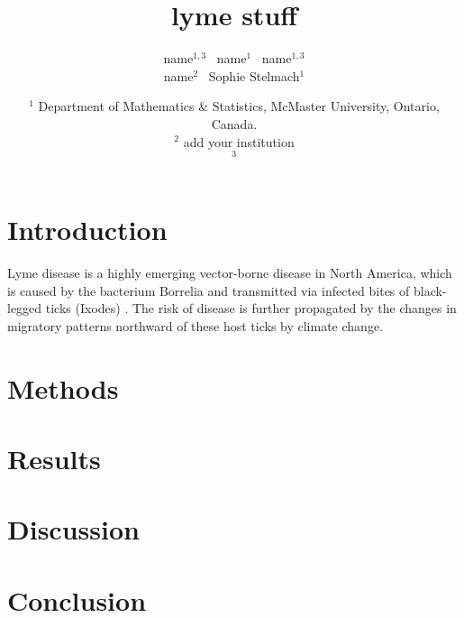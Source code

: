 \documentclass[12pt, centerh1]{article}
\title{lyme stuff}
\author{\qquad name$^{1,3}$ \qquad\  name$^{1}$ \qquad\  name$^{1,3}$ \\  name$^{2}$ \quad\ Sophie Stelmach$^{1}$}
\date{{\small $^1$ Department of Mathematics \& Statistics, McMaster University, Ontario, Canada.\\[-6pt]
$^2$ add your institution\\[-6pt]
$^3$ \\[-6pt]
}
}
\begin{document}
\maketitle



\section{Introduction}
Lyme disease is a highly emerging vector-borne disease in North America, which is caused by the bacterium Borrelia and transmitted via infected bites of black-legged ticks (Ixodes) \citep{govcan}. The risk of disease is further propagated by the changes in migratory patterns northward of these host ticks by climate change. 


\section{Methods}

\section{Results}

\section{Discussion}

\section{Conclusion}

\newpage

\end{document}
